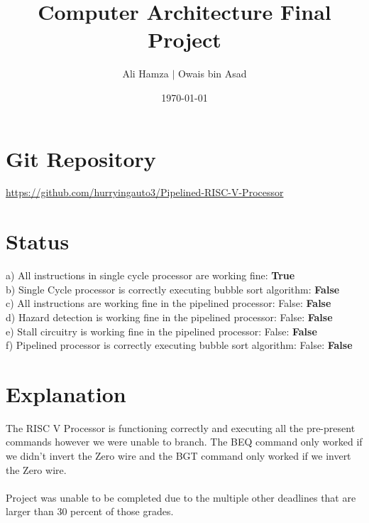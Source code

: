 \documentclass{article}
\title{Computer Architecture Final Project}
\author{Ali Hamza $|$ Owais bin Asad}
\date{\today}
\begin{document}
    \maketitle
    \section{Git Repository}
    \url{https://github.com/hurryingauto3/Pipelined-RISC-V-Processor}
    \section{Status}

            a) All instructions in single cycle processor are working fine: \textbf{True}\\
            b) Single Cycle processor is correctly executing bubble sort algorithm: \textbf{False}\\
            c) All instructions are working fine in the pipelined processor: False: \textbf{False}\\
            d) Hazard detection is working fine in the pipelined processor: False: \textbf{False}\\
            e) Stall circuitry is working fine in the pipelined processor: False: \textbf{False}\\
            f) Pipelined processor is correctly executing bubble sort algorithm: False: \textbf{False}\\

    \section{Explanation}

    The RISC V Processor is functioning correctly and executing all the pre-present commands however
    we were unable to branch. The BEQ command only worked if we didn't invert the Zero wire and the BGT command 
    only worked if we invert the Zero wire. \\\\ Project was unable to be completed due to the multiple other deadlines that are larger than 30 percent of those
    grades. 
        
    
\end{document}
